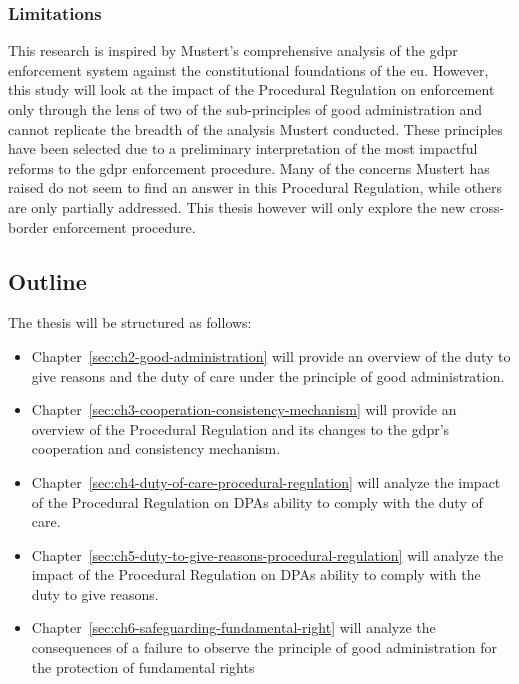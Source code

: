 \subsubsection{Limitations}
\label{sec:ch1-limitations}

This research is inspired by Mustert's comprehensive analysis of the \gls{gdpr} enforcement system against the constitutional foundations of the \gls{eu}.\autocite{mustertCrossborderEnforcementGDPR}
However, this study will look at the impact of the Procedural Regulation on enforcement only through the lens of two of the sub-principles of good administration and cannot replicate the breadth of the analysis Mustert conducted.
These principles have been selected due to a preliminary interpretation of the most impactful reforms to the \gls{gdpr} enforcement procedure. 
Many of the concerns Mustert has raised do not seem to find an answer in this Procedural Regulation, while others are only partially addressed.\autocite[]{mustertProceduralisingEnforcement2026}
This thesis however will only explore the new cross-border enforcement procedure. 

\subsection{Outline}
\label{sec:ch1-outline}

The thesis will be structured as follows:
\begin{itemize}
    \item Chapter~\ref{sec:ch2-good-administration} will provide an overview of the duty to give reasons and the duty of care under the principle of good administration.
    \item Chapter~\ref{sec:ch3-cooperation-consistency-mechanism} will provide an overview of the Procedural Regulation and its changes to the \gls{gdpr}'s cooperation and consistency mechanism.
    \item Chapter~\ref{sec:ch4-duty-of-care-procedural-regulation} will analyze the impact of the Procedural Regulation on DPAs ability to comply with the duty of care.
    \item Chapter~\ref{sec:ch5-duty-to-give-reasons-procedural-regulation} will analyze the impact of the Procedural Regulation on DPAs ability to comply with the duty to give reasons.
    \item Chapter~\ref{sec:ch6-safeguarding-fundamental-right} will analyze the consequences of a failure to observe the principle of good administration for the protection of fundamental rights
\end{itemize}